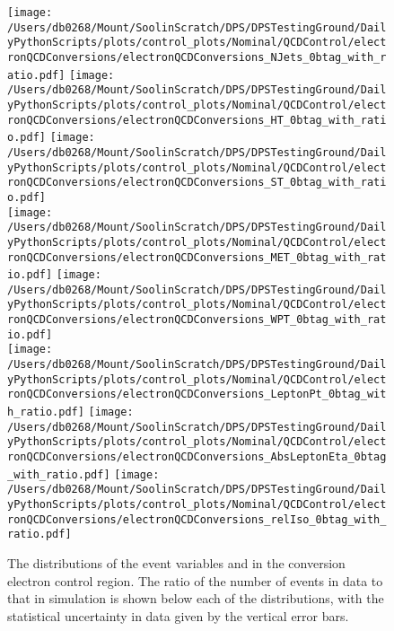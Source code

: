 \begin{figure}[hp]
	\centering
	\texttt{[image: /Users/db0268/Mount/SoolinScratch/DPS/DPSTestingGround/DailyPythonScripts/plots/control\_plots/Nominal/QCDControl/electronQCDConversions/electronQCDConversions\_NJets\_0btag\_with\_ratio.pdf]}
	\texttt{[image: /Users/db0268/Mount/SoolinScratch/DPS/DPSTestingGround/DailyPythonScripts/plots/control\_plots/Nominal/QCDControl/electronQCDConversions/electronQCDConversions\_HT\_0btag\_with\_ratio.pdf]}
	\texttt{[image: /Users/db0268/Mount/SoolinScratch/DPS/DPSTestingGround/DailyPythonScripts/plots/control\_plots/Nominal/QCDControl/electronQCDConversions/electronQCDConversions\_ST\_0btag\_with\_ratio.pdf]} \\
	\texttt{[image: /Users/db0268/Mount/SoolinScratch/DPS/DPSTestingGround/DailyPythonScripts/plots/control\_plots/Nominal/QCDControl/electronQCDConversions/electronQCDConversions\_MET\_0btag\_with\_ratio.pdf]}
	\texttt{[image: /Users/db0268/Mount/SoolinScratch/DPS/DPSTestingGround/DailyPythonScripts/plots/control\_plots/Nominal/QCDControl/electronQCDConversions/electronQCDConversions\_WPT\_0btag\_with\_ratio.pdf]} \\
	\texttt{[image: /Users/db0268/Mount/SoolinScratch/DPS/DPSTestingGround/DailyPythonScripts/plots/control\_plots/Nominal/QCDControl/electronQCDConversions/electronQCDConversions\_LeptonPt\_0btag\_with\_ratio.pdf]} 
	\texttt{[image: /Users/db0268/Mount/SoolinScratch/DPS/DPSTestingGround/DailyPythonScripts/plots/control\_plots/Nominal/QCDControl/electronQCDConversions/electronQCDConversions\_AbsLeptonEta\_0btag\_with\_ratio.pdf]}
	\texttt{[image: /Users/db0268/Mount/SoolinScratch/DPS/DPSTestingGround/DailyPythonScripts/plots/control\_plots/Nominal/QCDControl/electronQCDConversions/electronQCDConversions\_relIso\_0btag\_with\_ratio.pdf]}
	\caption[The distributions of the event variables and \Irel{} in the conversion electron control region. The ratio of the number of events in data to that in simulation is shown below each of the distributions, with the statistical uncertainty in data given by the vertical error bars.]{The distributions of the event variables and \Irel{} in the conversion electron control region. The ratio of the number of events in data to that in simulation is shown below each of the distributions, with the statistical uncertainty in data given by the vertical error bars.}
	\label{fig:QCDeConv}
\end{figure}
